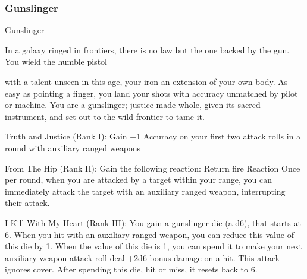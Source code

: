 \subsubsection{Gunslinger}

                                                  Gunslinger

In a galaxy ringed in frontiers, there is no law but the one backed by the gun. You wield the humble pistol

with a talent unseen in this age, your iron an extension of your own body. As easy as pointing a finger, you
land your shots with accuracy unmatched by pilot or machine. You are a gunslinger; justice made whole,
given its sacred instrument, and set out to the wild frontier to tame it.

Truth and Justice (Rank I): Gain +1 Accuracy on your first two attack rolls in a round with
auxiliary ranged weapons

From The Hip (Rank II): Gain the following reaction:
         Return fire
         Reaction
         Once per round, when you are attacked by a target within your range, you can
         immediately attack the target with an auxiliary ranged weapon, interrupting their attack.

I Kill With My Heart (Rank III): You gain a gunslinger die (a d6), that starts at 6. When you hit
with an auxiliary ranged weapon, you can reduce this value of this die by 1. When the value of
this die is 1, you can spend it to make your next auxiliary weapon attack roll deal +2d6 bonus
damage on a hit. This attack ignores cover. After spending this die, hit or miss, it resets back to
6.